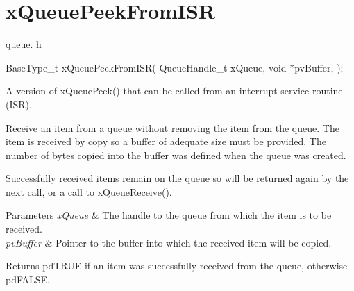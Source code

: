 \hypertarget{group__x_queue_peek_from_i_s_r}{}\section{x\+Queue\+Peek\+From\+I\+SR}
\label{group__x_queue_peek_from_i_s_r}
queue. h 
\begin{DoxyPre}
BaseType\_t xQueuePeekFromISR(
                                QueueHandle\_t xQueue,
                                void *pvBuffer,
                            );\end{DoxyPre}


A version of x\+Queue\+Peek() that can be called from an interrupt service routine (I\+SR).

Receive an item from a queue without removing the item from the queue. The item is received by copy so a buffer of adequate size must be provided. The number of bytes copied into the buffer was defined when the queue was created.

Successfully received items remain on the queue so will be returned again by the next call, or a call to x\+Queue\+Receive().


\begin{DoxyParams}{Parameters}
{\em x\+Queue} & The handle to the queue from which the item is to be received.\\
\hline
{\em pv\+Buffer} & Pointer to the buffer into which the received item will be copied.\\
\hline
\end{DoxyParams}
\begin{DoxyReturn}{Returns}
pd\+T\+R\+UE if an item was successfully received from the queue, otherwise pd\+F\+A\+L\+SE. 
\end{DoxyReturn}
